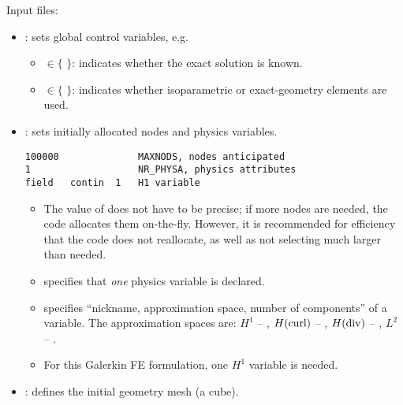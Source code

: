 Input files:
\begin{itemize}
	\item{: sets global control variables, e.g.
	\begin{itemize}
		\item {} $\in \{$  $\}$: indicates whether the exact solution is known.
		\item {} $\in \{$  $\}$: indicates whether isoparametric or exact-geometry elements are used.
	\end{itemize}
	}
	\item{: sets initially allocated nodes and physics variables.
\begin{lstlisting}[caption=\file{POISSON/GALERKIN/input/physics} input file.]
100000              MAXNODS, nodes anticipated
1                   NR_PHYSA, physics attributes
field   contin  1   H1 variable
\end{lstlisting}
	\begin{itemize}
		\item The value of  does not have to be precise; if more nodes are needed, the code allocates them on-the-fly. However, it is recommended for efficiency that the code does not reallocate, as well as not selecting  much larger than needed.
		\item {} specifies that \emph{one} physics variable is declared.
		\item {} specifies ``nickname, approximation space, number of components'' of a variable. The approximation spaces are: $H^1$ -- , $H(\text{curl})$ -- , $H(\text{div})$ -- , $L^2$ -- .
		\item For this Galerkin FE formulation, one $H^1$ variable is needed.
	\end{itemize}
	}
	\item{: defines the initial geometry mesh (a cube).}
\end{itemize}

